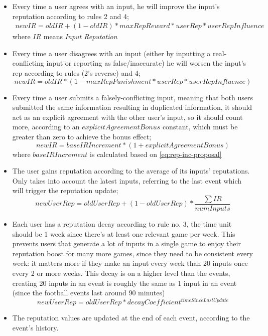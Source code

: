 \begin{itemize}
    \item Every time a user agrees with an input, he will improve the input's reputation according to rules 2 and 4;
    \begin{multline} \label{eq:rep-inc-proposal}
        newIR = oldIR + (1 - oldIR) * maxRepReward * userRep * userRepInfluence
    \end{multline}
    where $IR$ means \textit{Input Reputation}
    \item Every time a user disagrees with an input (either by inputting a real-conflicting input or reporting as false/inaccurate) he will worsen the input's rep according to rules (2's reverse) and 4;
    \begin{equation}
        newIR = oldIR * (1 - maxRepPunishment * userRep * userRepInfluence)
    \end{equation}
    \item Every time a user submits a falsely-conflicting input, meaning that both users submitted the same information resulting in duplicated information, it should act as an explicit agreement with the other user's input, so it should count more, according to an $explicitAgreementBonus$ constant, which must be greater than zero to achieve the bonus effect;
    \begin{equation}
    newIR = baseIRIncrement * (1 + explicitAgreementBonus)
    \end{equation}
    where $baseIRIncrement$ is calculated based on \ref{eq:rep-inc-proposal}
    \item The user gains reputation according to the average of its inputs' reputations. Only takes into account the latest inputs, referring to the last event which will trigger the reputation update;
    \begin{equation}
        newUserRep = oldUserRep + (1 - oldUserRep) * \frac{\sum IR}{numInputs}
    \end{equation}
    \item Each user has a reputation decay according to rule no. 3, the time unit should be 1 week since there's at least one relevant game per week. This prevents users that generate a lot of inputs in a single game to enjoy their reputation boost for many more games, since they need to be consistent every week: it matters more if they make an input every week than 20 inputs once every 2 or more weeks.
    This decay is on a higher level than the events, creating 20 inputs in an event is roughly the same as 1 input in an event (since the football events last around 90 minutes)
    \begin{equation}
        newUserRep = oldUserRep * decayCoefficient^{timeSinceLastUpdate}
    \end{equation}
    \item The reputation values are updated at the end of each event, according to the event's history.
\end{itemize}

